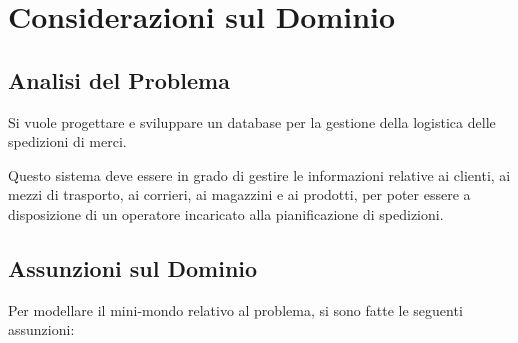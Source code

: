 \chapter{Considerazioni sul Dominio}\label{DomainAssumptions}

\section{Analisi del Problema}

Si vuole progettare e sviluppare un database per la gestione della logistica delle spedizioni di merci.

Questo sistema deve essere in grado di gestire le informazioni relative ai clienti, ai mezzi di trasporto, ai corrieri, ai magazzini e ai prodotti, per poter essere a disposizione di un operatore incaricato alla pianificazione di spedizioni.

\section{Assunzioni sul Dominio} 

Per modellare il mini-mondo relativo al problema, si sono fatte le seguenti assunzioni:

